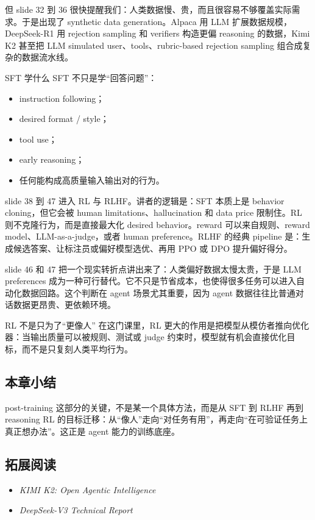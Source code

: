 \documentclass[a4paper]{article}
\begin{document}
但 slide 32 到 36 很快提醒我们：人类数据慢、贵，而且很容易不够覆盖实际需求。于是出现了 synthetic data generation。Alpaca 用 LLM 扩展数据规模，DeepSeek-R1 用 rejection sampling 和 verifiers 构造更偏 reasoning 的数据，Kimi K2 甚至把 LLM simulated user、tools、rubric-based rejection sampling 组合成复杂的数据流水线。

\begin{knowledgebox}{SFT 学什么}
SFT 不只是学“回答问题”：
\begin{itemize}
    \item instruction following；
    \item desired format / style；
    \item tool use；
    \item early reasoning；
    \item 任何能构成高质量输入输出对的行为。
\end{itemize}
\end{knowledgebox}

slide 38 到 47 进入 RL 与 RLHF。讲者的逻辑是：SFT 本质上是 behavior cloning，但它会被 human limitations、hallucination 和 data price 限制住。RL 则不克隆行为，而是直接最大化 desired behavior。reward 可以来自规则、reward model、LLM-as-a-judge，或者 human preference。RLHF 的经典 pipeline 是：生成候选答案、让标注员或偏好模型选优、再用 PPO 或 DPO 提升偏好得分。

slide 46 和 47 把一个现实转折点讲出来了：人类偏好数据太慢太贵，于是 LLM preferences 成为一种可行替代。它不只是节省成本，也使得很多任务可以进入自动化数据回路。这个判断在 agent 场景尤其重要，因为 agent 数据往往比普通对话数据更昂贵、更依赖环境。

\begin{warningbox}{RL 不是只为了“更像人”}
在这门课里，RL 更大的作用是把模型从模仿者推向优化器：当输出质量可以被规则、测试或 judge 约束时，模型就有机会直接优化目标，而不是只复刻人类平均行为。
\end{warningbox}

\subsection{本章小结}
post-training 这部分的关键，不是某一个具体方法，而是从 SFT 到 RLHF 再到 reasoning RL 的目标迁移：从“像人”走向“对任务有用”，再走向“在可验证任务上真正想办法”。这正是 agent 能力的训练底座。

\subsection{拓展阅读}
\begin{itemize}
    \item \emph{KIMI K2: Open Agentic Intelligence}
    \item \emph{DeepSeek-V3 Technical Report}
\end{itemize}
\end{document}
